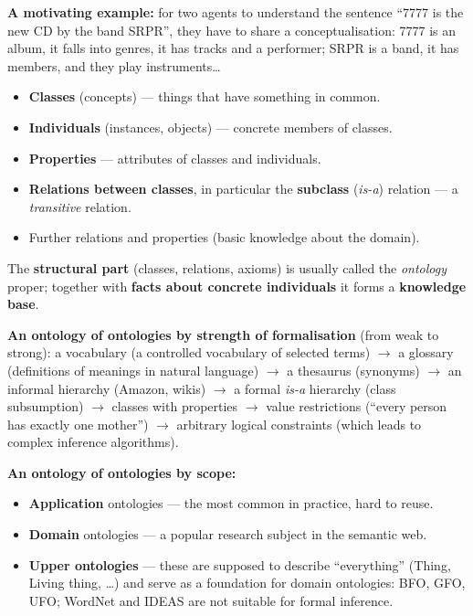 \documentclass[11pt,a4paper]{article}
\theoremstyle{definition}
\providecommand{\uv}[1]{``#1''}
\begin{document}
\textbf{A motivating example:} for two agents to understand the sentence \uv{7777 is the new CD
by the band SRPR}, they have to share a conceptualisation: 7777 is an album, it falls into
genres, it has tracks and a performer; SRPR is a band, it has members, and they play
instruments\dots

\begin{defbox}
\begin{itemize}
\item \textbf{Classes} (concepts) --- things that have something in common.
\item \textbf{Individuals} (instances, objects) --- concrete members of classes.
\item \textbf{Properties} --- attributes of classes and individuals.
\item \textbf{Relations between classes}, in particular the \textbf{subclass} (\emph{is-a}) relation
  --- a \emph{transitive} relation.
\item Further relations and properties (basic knowledge about the domain).
\end{itemize}
The \textbf{structural part} (classes, relations, axioms) is usually called the \emph{ontology}
proper; together with \textbf{facts about concrete individuals} it forms a \textbf{knowledge base}.
\end{defbox}

\textbf{An ontology of ontologies by strength of formalisation} (from weak to strong):
a vocabulary (a controlled vocabulary of selected terms) $\to$ a glossary (definitions of meanings in
natural language) $\to$ a thesaurus (synonyms) $\to$ an informal hierarchy (Amazon, wikis) $\to$
a formal \emph{is-a} hierarchy (class subsumption) $\to$ classes with properties $\to$
value restrictions (\uv{every person has exactly one mother}) $\to$ arbitrary logical constraints
(which leads to complex inference algorithms).

\textbf{An ontology of ontologies by scope:}
\begin{itemize}
\item \textbf{Application} ontologies --- the most common in practice, hard to reuse.
\item \textbf{Domain} ontologies --- a popular research subject in the semantic web.
\item \textbf{Upper ontologies} --- these are supposed to describe \uv{everything}
  (Thing, Living thing, \dots) and serve as a foundation for domain ontologies:
  BFO, GFO, UFO; WordNet and IDEAS are not suitable for formal inference.
\end{itemize}
\end{document}

